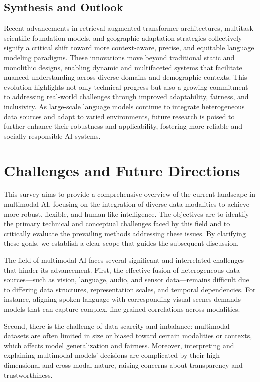 \documentclass[sigconf]{acmart}
\begin{document}
\subsection{Synthesis and Outlook}

Recent advancements in retrieval-augmented transformer architectures, multitask scientific foundation models, and geographic adaptation strategies collectively signify a critical shift toward more context-aware, precise, and equitable language modeling paradigms. These innovations move beyond traditional static and monolithic designs, enabling dynamic and multifaceted systems that facilitate nuanced understanding across diverse domains and demographic contexts. This evolution highlights not only technical progress but also a growing commitment to addressing real-world challenges through improved adaptability, fairness, and inclusivity. As large-scale language models continue to integrate heterogeneous data sources and adapt to varied environments, future research is poised to further enhance their robustness and applicability, fostering more reliable and socially responsible AI systems.

\section{Challenges and Future Directions}

This survey aims to provide a comprehensive overview of the current landscape in multimodal AI, focusing on the integration of diverse data modalities to achieve more robust, flexible, and human-like intelligence. The objectives are to identify the primary technical and conceptual challenges faced by this field and to critically evaluate the prevailing methods addressing these issues. By clarifying these goals, we establish a clear scope that guides the subsequent discussion.

The field of multimodal AI faces several significant and interrelated challenges that hinder its advancement. First, the effective fusion of heterogeneous data sources—such as vision, language, audio, and sensor data—remains difficult due to differing data structures, representation scales, and temporal dependencies. For instance, aligning spoken language with corresponding visual scenes demands models that can capture complex, fine-grained correlations across modalities.

Second, there is the challenge of data scarcity and imbalance: multimodal datasets are often limited in size or biased toward certain modalities or contexts, which affects model generalization and fairness. Moreover, interpreting and explaining multimodal models' decisions are complicated by their high-dimensional and cross-modal nature, raising concerns about transparency and trustworthiness.
\end{document}
